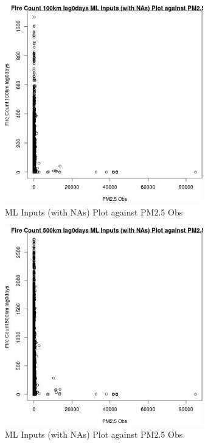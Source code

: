 \begin{figure} 
\centering  
\includegraphics[width=0.77\textwidth]{Code_Outputs/Report_ML_input_PM25_Step4_part_f_de_duplicated_aveswNAs_Fire_Count_100km_lag0daysvPM25_Obs.jpg} 
\caption{\label{fig:Report_ML_input_PM25_Step4_part_f_de_duplicated_aveswNAsFire_Count_100km_lag0daysvPM25_Obs}ML Inputs (with NAs) Plot against PM2.5 Obs} 
\end{figure} 
 

\begin{figure} 
\centering  
\includegraphics[width=0.77\textwidth]{Code_Outputs/Report_ML_input_PM25_Step4_part_f_de_duplicated_aveswNAs_Fire_Count_500km_lag0daysvPM25_Obs.jpg} 
\caption{\label{fig:Report_ML_input_PM25_Step4_part_f_de_duplicated_aveswNAsFire_Count_500km_lag0daysvPM25_Obs}ML Inputs (with NAs) Plot against PM2.5 Obs} 
\end{figure} 
 

